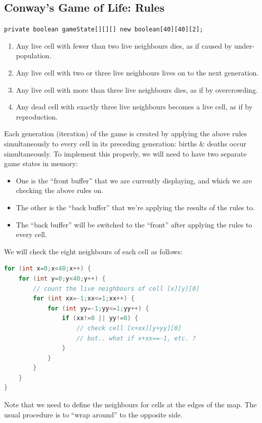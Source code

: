 \documentclass[11pt]{article}
\begin{document}
\subsection{Conway's Game of Life: Rules}
\verb|private boolean gameState[][][] new boolean[40][40][2];|

\begin{enumerate}
    \item   Any live cell with fewer than two live neighbours dies, as if caused by under-population.
    \item   Any live cell with two or three live neighbours lives on to the next generation.
    \item   Any live cell with more than three live neighbours dies, as if by overcrowding. 
    \item   Any dead cell with exactly three live neighbours becomes a live cell, as if by reproduction.
\end{enumerate}

Each generation (iteration) of the game is created by applying the above rules simultaneously to every cell in its 
preceding generation: births \& deaths occur simultaneously.
To implement this properly, we will need to have two separate game states in memory:
\begin{itemize}
    \item   One is the ``front buffer'' that we are currently displaying, and which we are checking the above rules on. 
    \item   The other is the ``back buffer'' that we're applying the results of the rules to.
    \item   The ``back buffer'' will be switched to the ``front'' after applying the rules to every cell.
\end{itemize}

We will check the eight neighbours of each cell as follows:
\begin{lstlisting}[language=java]
for (int x=0;x<40;x++) {
    for (int y=0;y<40;y++) {
        // count the live neighbours of cell [x][y][0]
        for (int xx=-1;xx<=1;xx++) {
            for (int yy=-1;yy<=1;yy++) {
                if (xx!=0 || yy!=0) {
                    // check cell [x+xx][y+yy][0]
                    // but.. what if x+xx==-1, etc. ?
                }
            }
        }
    }      
}
\end{lstlisting}

Note that we need to define the neighbours for cells at the edges of the map. 
The usual procedure is to ``wrap around'' to the opposite side.
\end{document}
